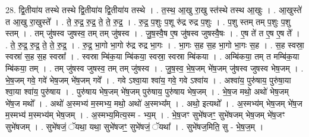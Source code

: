 \documentclass[17pt]{extarticle}
\begin{document}
28. द्वि॒तीया॑य तस्थे तस्थे द्वि॒तीया॑य द्वि॒तीया॑य तस्थे । . त॒स्थ॒ आ॒खु रा॒खु स्त॑स्थे तस्थ आ॒खुः । . आ॒खुस्ते॑ त आ॒खु रा॒खुस्ते᳚ । . ते॒ रु॒द्र॒ रु॒द्र॒ ते॒ ते॒ रु॒द्र॒ । . रु॒द्र॒ प॒शुः प॒शू रु॑द्र रुद्र प॒शुः । . प॒शु स्तम् तम् प॒शुः प॒शु स्तम् । . तम् जु॑षस्व जुषस्व॒ तम् तम् जु॑षस्व । . जु॒ष॒स्वै॒ष ए॒ष जु॑षस्व जुषस्वै॒षः । . ए॒ष ते॑ त ए॒ष ए॒ष ते᳚ । . ते॒ रु॒द्र॒ रु॒द्र॒ ते॒ ते॒ रु॒द्र॒ । . रु॒द्र॒ भा॒गो भा॒गो रु॑द्र रुद्र भा॒गः । . भा॒गः स॒ह स॒ह भा॒गो भा॒गः स॒ह । . स॒ह स्वस्रा॒ स्वस्रा॑ स॒ह स॒ह स्वस्रा᳚ । . स्वस्रा म्बि॑क॒या म्बि॑कया॒ स्वस्रा॒ स्वस्रा म्बि॑कया । . अम्बि॑कया॒ तम् त मम्बि॑क॒या म्बि॑कया॒ तम् । . तम् जु॑षस्व जुषस्व॒ तम् तम् जु॑षस्व । . जु॒ष॒स्व॒ भे॒ष॒जम् भे॑ष॒जम् जु॑षस्व जुषस्व भेष॒जम् । . भे॒ष॒जम् गवे॒ गवे॑ भेष॒जम् भे॑ष॒जम् गवे᳚ । . गवे ऽश्वा॒या श्वा॑य॒ गवे॒ गवे ऽश्वा॑य । . अश्वा॑य॒ पुरु॑षाय॒ पुरु॑षा॒या श्वा॒या श्वा॑य॒ पुरु॑षाय । . पुरु॑षाय भेष॒जम् भे॑ष॒जम् पुरु॑षाय॒ पुरु॑षाय भेष॒जम् । . भे॒ष॒ज मथो॒ अथो॑ भेष॒जम् भे॑ष॒ज मथो᳚ । . अथो॑ अ॒स्मभ्य॑ म॒स्मभ्य॒ मथो॒ अथो॑ अ॒स्मभ्य᳚म् । . अथो॒ इत्यथो᳚ । . अ॒स्मभ्य॑म् भेष॒जम् भे॑ष॒ज म॒स्मभ्य॑ म॒स्मभ्य॑म् भेष॒जम् । . अ॒स्मभ्य॒मित्य॒स्म - भ्य॒म् । . भे॒ष॒जꣳ सुभे॑षजꣳ॒॒ सुभे॑षजम् भेष॒जम् भे॑ष॒जꣳ सुभे॑षजम् । . सुभे॑षजं॒ ॅयथा॒ यथा॒ सुभे॑षजꣳ॒॒ सुभे॑षजं॒ ॅयथा᳚ । . सुभे॑षज॒मिति॒ सु - भे॒ष॒ज॒म् । \newline
\end{document}
